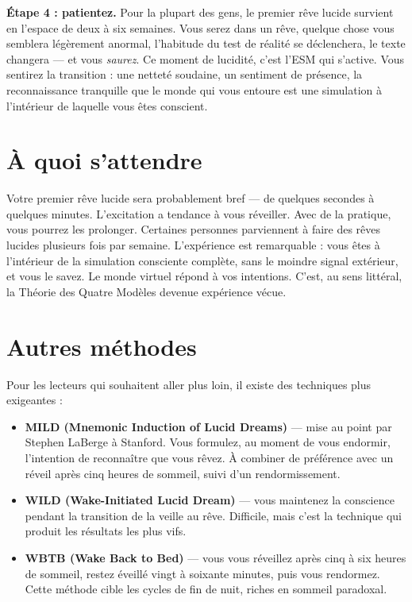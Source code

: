 \documentclass[11pt, twoside, openright]{book}
\begin{document}
\textbf{Étape 4 : patientez.} Pour la plupart des gens, le premier rêve lucide survient en l'espace de deux à six semaines. Vous serez dans un rêve, quelque chose vous semblera légèrement anormal, l'habitude du test de réalité se déclenchera, le texte changera --- et vous \textit{saurez}. Ce moment de lucidité, c'est l'ESM qui s'active. Vous sentirez la transition : une netteté soudaine, un sentiment de présence, la reconnaissance tranquille que le monde qui vous entoure est une simulation à l'intérieur de laquelle vous êtes conscient.

\section*{À quoi s'attendre}

Votre premier rêve lucide sera probablement bref --- de quelques secondes à quelques minutes. L'excitation a tendance à vous réveiller. Avec de la pratique, vous pourrez les prolonger. Certaines personnes parviennent à faire des rêves lucides plusieurs fois par semaine. L'expérience est remarquable : vous êtes à l'intérieur de la simulation consciente complète, sans le moindre signal extérieur, et vous le savez. Le monde virtuel répond à vos intentions. C'est, au sens littéral, la Théorie des Quatre Modèles devenue expérience vécue.

\section*{Autres méthodes}

Pour les lecteurs qui souhaitent aller plus loin, il existe des techniques plus exigeantes :

\begin{itemize}
  \item \textbf{MILD (Mnemonic Induction of Lucid Dreams)} --- mise au point par Stephen LaBerge à Stanford. Vous formulez, au moment de vous endormir, l'intention de reconnaître que vous rêvez. À combiner de préférence avec un réveil après cinq heures de sommeil, suivi d'un rendormissement.
  \item \textbf{WILD (Wake-Initiated Lucid Dream)} --- vous maintenez la conscience pendant la transition de la veille au rêve. Difficile, mais c'est la technique qui produit les résultats les plus vifs.
  \item \textbf{WBTB (Wake Back to Bed)} --- vous vous réveillez après cinq à six heures de sommeil, restez éveillé vingt à soixante minutes, puis vous rendormez. Cette méthode cible les cycles de fin de nuit, riches en sommeil paradoxal.
\end{itemize}
\end{document}
